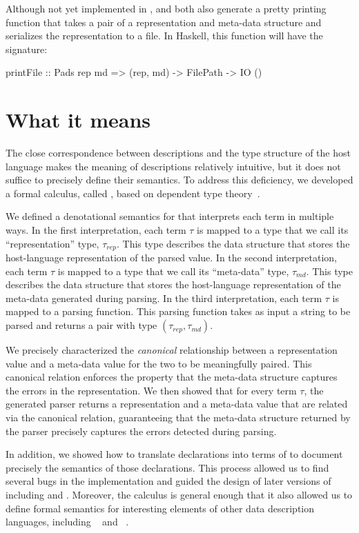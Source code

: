 \documentclass{sig-alternate}
\begin{document}
Although not yet implemented in \padshaskell{}, \padsc{} and
\padsml{} both also generate a pretty printing function that takes a
pair of a representation and meta-data structure and serializes the
representation to a file.  In Haskell, this function will have the
signature:
\begin{code}
printFile :: Pads rep md => 
             (rep, md) -> FilePath -> IO ()
\end{code}



\section{What it means}
\label{sec:formal}
The close correspondence between \pads{} descriptions and the type
structure of the host language makes the meaning of \pads{}
descriptions relatively intuitive, but it does not suffice to
precisely define their semantics.  To address this deficiency, we
developed a formal calculus, called \ddca{}\hskip -5pt,\hskip 5pt based on dependent type
theory~\cite{Fisher+:ddca}.  

We defined a denotational semantics for \ddca{} that interprets
each term in multiple ways.  In the first interpretation, each \ddca{}
term $\tau$ is mapped to a type that we call its ``representation''
type, $\tau_{rep}$.  This type describes the data structure that stores the
host-language representation of the parsed value.  In the second
interpretation, each \ddca{} term $\tau$ is mapped to a type that we
call its ``meta-data'' type, $\tau_{md}$.  This type describes the data
structure that stores the host-language representation of the
meta-data generated during parsing.  In the third interpretation, each
\ddca{} term $\tau$ is mapped to a parsing function.  This parsing
function takes as input a string to be parsed and returns a pair with
type $(\tau_{rep}, \tau_{md})$.

We precisely characterized the \textit{canonical} relationship between a
representation value and a meta-data value for the two to be
meaningfully paired.  This canonical relation enforces the property
that the meta-data structure captures the errors in the
representation.  We then showed that for every \ddca{} term $\tau$,
the generated parser returns a representation and a meta-data value
that are related via the canonical relation, guaranteeing that the
meta-data structure returned by the parser precisely captures the
errors detected during parsing. 

In addition, we showed how to translate \pads{} declarations into terms of
\ddca{} to document precisely the semantics of those declarations.
This process allowed us to find several bugs in the \padsc{}
implementation and guided the design of later versions of \pads{}
including \padsml{} and \padshaskell{}.  Moreover,
the \ddca{} calculus is general enough that it also allowed us to
define formal semantics for interesting elements of other data description languages,
including \packettypes{}~\cite{sigcomm00} and
\datascript{}~\cite{gpce02}. 
\end{document}
